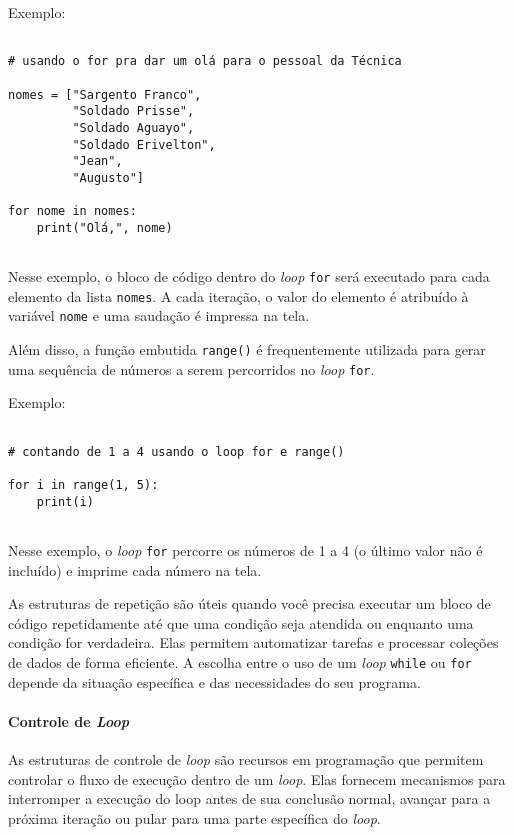 \documentclass[a4paper, 12pt, onecolumn,singlespacing]{article}
\begin{document}
	Exemplo:
	
	\begin{verbatim}

# usando o for pra dar um olá para o pessoal da Técnica

nomes = ["Sargento Franco", 
         "Soldado Prisse", 
         "Soldado Aguayo",
         "Soldado Erivelton",
         "Jean",
         "Augusto"]
		 
for nome in nomes:
	print("Olá,", nome)
		
	\end{verbatim}
	\label{loop_for}

Nesse exemplo, o bloco de código dentro do \textit{loop} \texttt{for} será executado para cada elemento da lista \texttt{nomes}. A cada iteração, o valor do elemento é atribuído à variável \texttt{nome} e uma saudação é impressa na tela.

Além disso, a função embutida \texttt{range()} é frequentemente utilizada para gerar uma sequência de números a serem 
percorridos no \textit{loop} \texttt{for}.

Exemplo:

	\begin{verbatim}
		
# contando de 1 a 4 usando o loop for e range()
		
for i in range(1, 5):
	print(i)
	
	\end{verbatim}
	\label{loop_for_range}

Nesse exemplo, o \textit{loop} \texttt{for} percorre os números de 1 a 4 (o último valor não é incluído) e imprime cada número na tela.

As estruturas de repetição são úteis quando você precisa executar um bloco de código repetidamente até que uma condição seja atendida ou enquanto uma condição for verdadeira. Elas permitem automatizar tarefas e processar coleções de dados de forma eficiente. A escolha entre o uso de um \textit{loop} \texttt{while} ou \texttt{for} depende da situação específica e das necessidades do seu programa.

	\paragraph{Controle de \textit{Loop}} 
	\label{python_controle_loop}
	As estruturas de controle de \textit{loop} são recursos em programação que permitem controlar o fluxo de execução dentro de um \textit{loop}. Elas fornecem mecanismos para interromper a execução do loop antes de sua conclusão normal, avançar para a próxima iteração ou pular para uma parte específica do \textit{loop}.
	
\end{document}
